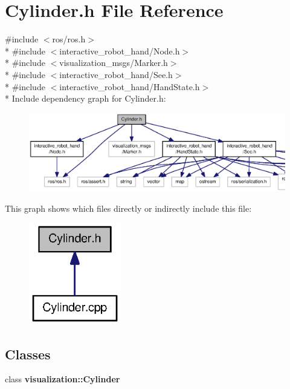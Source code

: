 \section{Cylinder.\-h File Reference}
\label{Cylinder_8h}
{\ttfamily \#include $<$ros/ros.\-h$>$}\\*
{\ttfamily \#include $<$interactive\-\_\-robot\-\_\-hand/\-Node.\-h$>$}\\*
{\ttfamily \#include $<$visualization\-\_\-msgs/\-Marker.\-h$>$}\\*
{\ttfamily \#include $<$interactive\-\_\-robot\-\_\-hand/\-See.\-h$>$}\\*
{\ttfamily \#include $<$interactive\-\_\-robot\-\_\-hand/\-Hand\-State.\-h$>$}\\*
Include dependency graph for Cylinder.\-h\-:
\nopagebreak
\begin{figure}[H]
\begin{center}
\leavevmode
\includegraphics[width=350pt]{Cylinder_8h__incl}
\end{center}
\end{figure}
This graph shows which files directly or indirectly include this file\-:
\nopagebreak
\begin{figure}[H]
\begin{center}
\leavevmode
\includegraphics[width=114pt]{Cylinder_8h__dep__incl}
\end{center}
\end{figure}
\subsection*{Classes}
\begin{DoxyCompactItemize}
\item 
class {\bf visualization\-::\-Cylinder}
\end{DoxyCompactItemize}
